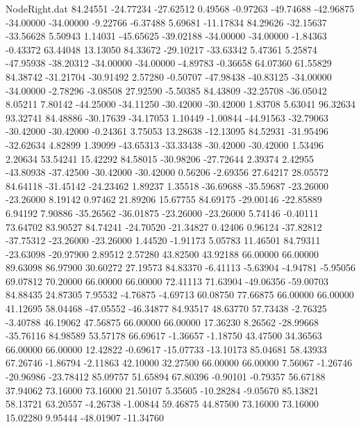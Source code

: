 \begin{filecontents}{NodeRight.dat}
  84.24551  -24.77234  -27.62512     0.49568   -0.97263  -49.74688  -42.96875  -34.00000  -34.00000   -9.22766   -6.37488    5.69681  -11.17834
  84.29626  -32.15637  -33.56628     5.50943    1.14031  -45.65625  -39.02188  -34.00000  -34.00000   -1.84363   -0.43372   63.44048   13.13050
  84.33672  -29.10217  -33.63342     5.47361    5.25874  -47.95938  -38.20312  -34.00000  -34.00000   -4.89783   -0.36658   64.07360   61.55829
  84.38742  -31.21704  -30.91492     2.57280   -0.50707  -47.98438  -40.83125  -34.00000  -34.00000   -2.78296   -3.08508   27.92590   -5.50385
  84.43809  -32.25708  -36.05042     8.05211    7.80142  -44.25000  -34.11250  -30.42000  -30.42000    1.83708    5.63041   96.32634   93.32741
  84.48886  -30.17639  -34.17053     1.10449   -1.00844  -44.91563  -32.79063  -30.42000  -30.42000   -0.24361    3.75053   13.28638  -12.13095
  84.52931  -31.95496  -32.62634     4.82899    1.39099  -43.65313  -33.33438  -30.42000  -30.42000    1.53496    2.20634   53.54241   15.42292
  84.58015  -30.98206  -27.72644     2.39374    2.42955  -43.80938  -37.42500  -30.42000  -30.42000    0.56206   -2.69356   27.64217   28.05572
  84.64118  -31.45142  -24.23462     1.89237    1.35518  -36.69688  -35.59687  -23.26000  -23.26000    8.19142    0.97462   21.89206   15.67755
  84.69175  -29.00146  -22.85889     6.94192    7.90886  -35.26562  -36.01875  -23.26000  -23.26000    5.74146   -0.40111   73.64702   83.90527
  84.74241  -24.70520  -21.34827     0.42406    0.96124  -37.82812  -37.75312  -23.26000  -23.26000    1.44520   -1.91173    5.05783   11.46501
  84.79311  -23.63098  -20.97900     2.89512    2.57280   43.82500   43.92188   66.00000   66.00000   89.63098   86.97900   30.60272   27.19573
  84.83370   -6.41113   -5.63904    -4.94781   -5.95056   69.07812   70.20000   66.00000   66.00000   72.41113   71.63904  -49.06356  -59.00703
  84.88435   24.87305    7.95532    -4.76875   -4.69713   60.08750   77.66875   66.00000   66.00000   41.12695   58.04468  -47.05552  -46.34877
  84.93517   48.63770   57.73438    -2.76325   -3.40788   46.19062   47.56875   66.00000   66.00000   17.36230    8.26562  -28.99668  -35.76116
  84.98589   53.57178   66.69617    -1.36657   -1.18750   43.47500   34.36563   66.00000   66.00000   12.42822   -0.69617  -15.07733  -13.10173
  85.04681   58.43933   67.26746    -1.86794   -2.11863   42.10000   32.27500   66.00000   66.00000    7.56067   -1.26746  -20.96986  -23.78412
  85.09757   51.65894   67.80396    -0.90101   -0.79357   56.67188   37.94062   73.16000   73.16000   21.50107    5.35605  -10.28284   -9.05670
  85.13821   58.13721   63.20557    -4.26738   -1.00844   59.46875   44.87500   73.16000   73.16000   15.02280    9.95444  -48.01907  -11.34760

\end{filecontents}

